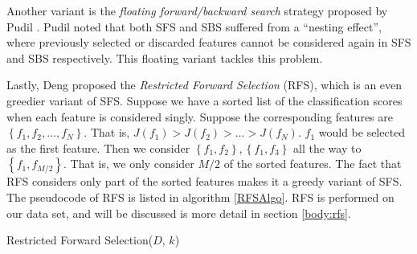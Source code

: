\documentclass[12pt, twoside, a4paper]{report}
\begin{document}
Another variant is the \textit{floating forward/backward search} strategy proposed by Pudil \cite{RefWorks:178}. Pudil noted that both SFS and SBS suffered from a ``nesting effect'', where previously selected or discarded features cannot be considered again in SFS and SBS respectively. This floating variant tackles this problem.

Lastly, Deng \cite{deng1998omega} proposed the \textit{Restricted Forward Selection} (RFS), which is an even greedier variant of SFS. Suppose we have a sorted list of the classification scores when each feature is considered singly. Suppose the corresponding features are $\left\lbrace f_1, f_2, \dots , f_N \right\rbrace$. That is, $J(f_1) > J(f_2) > \dots > J(f_N)$. $f_1$ would be selected as the first feature. Then we consider $\left\lbrace f_1, f_2 \right\rbrace, \left\lbrace f_1, f_3 \right\rbrace$ all the way to $\left\lbrace f_1, f_{M/2} \right\rbrace$. That is, we only consider $M/2$ of the sorted features. The fact that RFS considers only part of the sorted features makes it a greedy variant of SFS. The pseudocode of RFS is listed in algorithm \ref{RFSAlgo}. RFS is performed on our data set, and will be discussed is more detail in section \ref{body:rfs}.


\begin{algorithm}
\DontPrintSemicolon
{}
\BlankLine
{}
\caption{Restricted Forward Selection($D$, $k$) \label{RFSAlgo}}
\end{algorithm}
\end{document}
